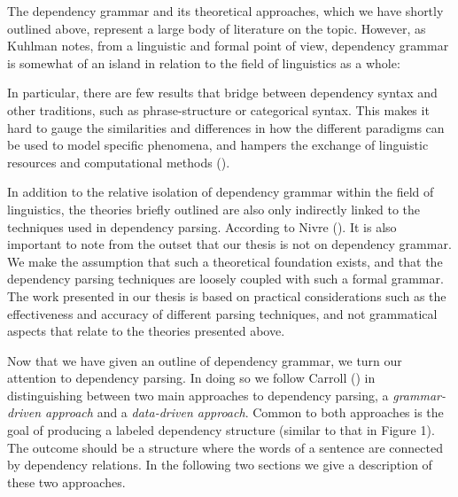 \documentclass[10pt]{article}
\begin{document}
The dependency grammar and its theoretical approaches, which we have shortly outlined above, represent a large body of literature on the topic. However, as Kuhlman notes, from a linguistic and formal point of view, dependency grammar is somewhat of an island in relation to the field of linguistics as a whole:

\begin{displayquote}
In particular, there are few results that bridge between dependency syntax and other traditions, such as phrase-structure or categorical syntax. This makes it hard to gauge the similarities and differences in how the different paradigms can be used to model specific phenomena, and hampers the exchange of linguistic resources and computational methods (\cite{kuhlmann2010dependency}).
\end{displayquote}

In addition to the relative isolation of dependency grammar within the field of linguistics, the theories briefly outlined are also only indirectly linked to the techniques used in dependency parsing. According to Nivre  (\cite{Nivre05dependencygrammar}). It is also important to note from the outset that our thesis is not on dependency grammar. We make the assumption that such a theoretical foundation exists, and that the dependency parsing techniques are loosely coupled with such a formal grammar. The work presented in our thesis is based on practical considerations such as the effectiveness and accuracy of different parsing techniques, and not grammatical aspects that relate to the theories presented above.

Now that we have given an outline of dependency grammar, we turn our attention to dependency parsing. In doing so we follow Carroll (\cite{carroll2000statistical}) in distinguishing between two main approaches to dependency parsing, a \textit{grammar-driven approach} and a \textit{data-driven approach}. Common to both approaches is the goal of producing a labeled dependency structure (similar to that in Figure 1). The outcome should be a structure where the words of a sentence are connected by dependency relations. In the following two sections we give a description of these two approaches.

\end{document}
